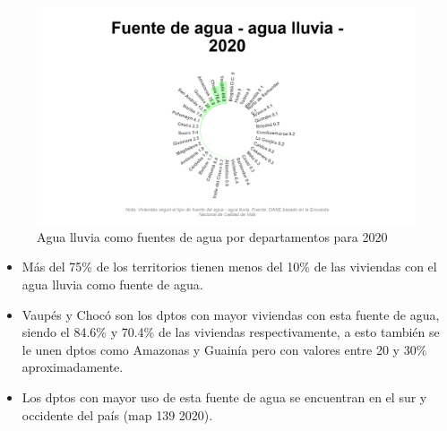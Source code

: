     \begin{figure}[H]
        \caption{Agua lluvia como fuentes de agua por departamentos para 2020 \label{map_result_2} }
        \begin{center}
        \includegraphics[width=\textwidth,keepaspectratio]{img/var_139_static.png}
        \end{center}
    \end{figure}
            \begin{itemize}
                    \item Más del 75\% de los territorios tienen menos del 10\% de las viviendas con el agua lluvia como fuente de agua.
                    \item Vaupés y Chocó son los dptos con mayor viviendas con esta fuente de agua, siendo el 84.6\% y 70.4\% de las viviendas respectivamente, a esto también se le unen dptos como Amazonas y Guainía pero con valores entre 20 y 30\% aproximadamente.
                    \item Los dptos con mayor uso de esta fuente de agua se encuentran en el sur y occidente del país (map 139 2020).
                    \end{itemize}

